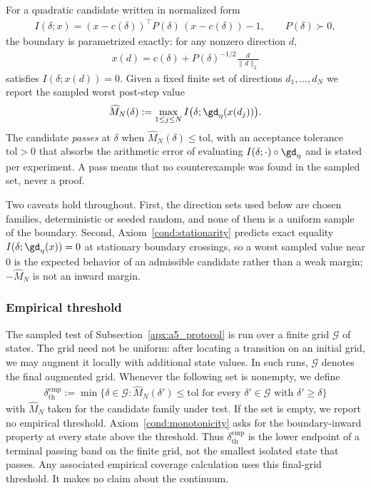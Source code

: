 \documentclass{article}
\begin{document}
For a quadratic candidate written in normalized form
\begin{align}
    I(\delta;x)=(x-c(\delta))^\top P(\delta)\,(x-c(\delta))-1,
    \qquad P(\delta)\succ0,
    \label{eq:apxL_normalized_candidate}
\end{align}
the boundary is parametrized exactly: for any nonzero direction $d$,
\begin{align}
    x(d)=c(\delta)+P(\delta)^{-1/2}\frac{d}{\|d\|_2}
    \label{eq:apxL_boundary_point}
\end{align}
satisfies $I(\delta;x(d))=0$. Given a fixed finite set of directions
$d_1,\dots,d_N$ we report the sampled worst post-step value
\begin{align}
    \widehat M_N(\delta)
    :=
    \max_{1\le j\le N}
    I\bigl(\delta;\gd_\eta(x(d_j))\bigr).
    \label{eq:apxL_sampled_max}
\end{align}
The candidate \emph{passes} at $\delta$ when
$\widehat M_N(\delta)\le\mathrm{tol}$, with an acceptance tolerance
$\mathrm{tol}>0$ that absorbs the arithmetic error of evaluating
$I(\delta;\cdot)\circ\gd_\eta$ and is stated per experiment. A pass means that
no counterexample was found in the sampled set, never a proof.

Two caveats hold throughout. First, the direction sets used below are chosen
families, deterministic or seeded random, and none of them is a uniform sample
of the boundary. Second, Axiom~\ref{cond:stationarity} predicts exact equality
$I(\delta;\gd_\eta(x))=0$ at stationary boundary crossings, so a worst sampled
value near $0$ is the expected behavior of an admissible candidate rather than
a weak margin; $-\widehat M_N$ is not an inward margin.

\subsubsection{Empirical threshold}
\label{apx:discovery_validation}

The sampled test of Subsection~\ref{apx:a5_protocol} is run over a finite grid
$\mathcal G$ of states. The grid need not be uniform: after locating a
transition on an initial grid, we may augment it locally with additional state
values. In such runs, $\mathcal G$ denotes the final augmented grid. Whenever
the following set is nonempty, we define
\begin{align}
    \delta_{\mathrm{th}}^{\mathrm{emp}}
    :=
    \min\bigl\{
        \delta\in\mathcal G:
        \widehat M_N(\delta')\le\mathrm{tol}
        \text{ for every }\delta'\in\mathcal G\text{ with }\delta'\ge\delta
    \bigr\}
    \label{eq:apxL_empirical_threshold}
\end{align}
with $\widehat M_N$ taken for the candidate family under test. If the set is
empty, we report no empirical threshold.
Axiom~\ref{cond:monotonicity} asks for the boundary-inward property at every
state above the threshold. Thus $\delta_{\mathrm{th}}^{\mathrm{emp}}$ is the
lower endpoint of a terminal passing band on the finite grid, not the smallest
isolated state that passes. Any associated empirical coverage calculation uses
this final-grid threshold. It makes no claim about the continuum.
\end{document}
